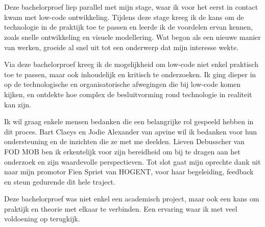 
\chapter{}%
\label{ch:voorwoord}

Deze bachelorproef liep parallel met mijn stage, waar ik voor het eerst in contact kwam met low-code ontwikkeling. Tijdens deze stage kreeg ik de kans om de technologie in de praktijk toe te passen en leerde ik de voordelen ervan kennen, zoals snelle ontwikkeling en visuele modellering. Wat begon als een nieuwe manier van werken, groeide al snel uit tot een onderwerp dat mijn interesse wekte.

Via deze bachelorproef kreeg ik de mogelijkheid om low-code niet enkel praktisch toe te passen, maar ook inhoudelijk en kritisch te onderzoeken. Ik ging dieper in op de technologische en organisatorische afwegingen die bij low-code komen kijken, en ontdekte hoe complex de besluitvorming rond technologie in realiteit kan zijn.

Ik wil graag enkele mensen bedanken die een belangrijke rol gespeeld hebben in dit proces. Bart Claeys en Jodie Alexander van apvine wil ik bedanken voor hun ondersteuning en de inzichten die ze met me deelden. Lieven Debusscher van \gls{FOD MOB} ben ik erkentelijk voor zijn bereidheid om bij te dragen aan het onderzoek en zijn waardevolle perspectieven. Tot slot gaat mijn oprechte dank uit naar mijn promotor Fien Spriet van HOGENT, voor haar begeleiding, feedback en steun gedurende dit hele traject.

Deze bachelorproef was niet enkel een academisch project, maar ook een kans om praktijk en theorie met elkaar te verbinden. Een ervaring waar ik met veel voldoening op terugkijk.


